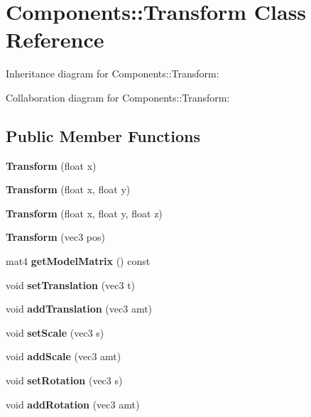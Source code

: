 \section{Components\+:\+:Transform Class Reference}
\label{class_components_1_1_transform}


Inheritance diagram for Components\+:\+:Transform\+:


Collaboration diagram for Components\+:\+:Transform\+:
\subsection*{Public Member Functions}
\begin{DoxyCompactItemize}
\item 
\mbox{\label{class_components_1_1_transform_a99d1aa66792547fd54dd64a123537bbf}} 
{\bfseries Transform} (float x)
\item 
\mbox{\label{class_components_1_1_transform_a9fb589a9cfea2025a8619666cbb76019}} 
{\bfseries Transform} (float x, float y)
\item 
\mbox{\label{class_components_1_1_transform_a52419fabf2513dbd10020e65b835a1f0}} 
{\bfseries Transform} (float x, float y, float z)
\item 
\mbox{\label{class_components_1_1_transform_a6013c12f65f2e2563343f4e84f2c2433}} 
{\bfseries Transform} (vec3 pos)
\item 
\mbox{\label{class_components_1_1_transform_ab0eab798d3485ca1fb2ecc73764b6b90}} 
mat4 {\bfseries get\+Model\+Matrix} () const
\item 
\mbox{\label{class_components_1_1_transform_a6b3dd94793e8f2394189d4b74ea5e00a}} 
void {\bfseries set\+Translation} (vec3 t)
\item 
\mbox{\label{class_components_1_1_transform_a32d69d63e3c65fa44952d4d1e3c0c568}} 
void {\bfseries add\+Translation} (vec3 amt)
\item 
\mbox{\label{class_components_1_1_transform_a94dc562c8182c70e1fb6c23fc2d9f24c}} 
void {\bfseries set\+Scale} (vec3 s)
\item 
\mbox{\label{class_components_1_1_transform_aafd412a9c4f50096e2a2f6cd528105db}} 
void {\bfseries add\+Scale} (vec3 amt)
\item 
\mbox{\label{class_components_1_1_transform_a7578b47ec6a28d67ec407fa2b6bef430}} 
void {\bfseries set\+Rotation} (vec3 s)
\item 
\mbox{\label{class_components_1_1_transform_a197f7319f179e8daa9b1b35dce995c11}} 
void {\bfseries add\+Rotation} (vec3 amt)

\end{DoxyCompactItemize}
